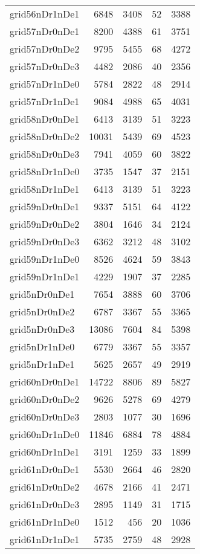 \begin{longtable}{lrrrr}
grid56nDr1nDe1 & 6848 & 3408 & 52 & 3388 \\
grid57nDr0nDe1 & 8200 & 4388 & 61 & 3751 \\
grid57nDr0nDe2 & 9795 & 5455 & 68 & 4272 \\
grid57nDr0nDe3 & 4482 & 2086 & 40 & 2356 \\
grid57nDr1nDe0 & 5784 & 2822 & 48 & 2914 \\
grid57nDr1nDe1 & 9084 & 4988 & 65 & 4031 \\
grid58nDr0nDe1 & 6413 & 3139 & 51 & 3223 \\
grid58nDr0nDe2 & 10031 & 5439 & 69 & 4523 \\
grid58nDr0nDe3 & 7941 & 4059 & 60 & 3822 \\
grid58nDr1nDe0 & 3735 & 1547 & 37 & 2151 \\
grid58nDr1nDe1 & 6413 & 3139 & 51 & 3223 \\
grid59nDr0nDe1 & 9337 & 5151 & 64 & 4122 \\
grid59nDr0nDe2 & 3804 & 1646 & 34 & 2124 \\
grid59nDr0nDe3 & 6362 & 3212 & 48 & 3102 \\
grid59nDr1nDe0 & 8526 & 4624 & 59 & 3843 \\
grid59nDr1nDe1 & 4229 & 1907 & 37 & 2285 \\
grid5nDr0nDe1 & 7654 & 3888 & 60 & 3706 \\
grid5nDr0nDe2 & 6787 & 3367 & 55 & 3365 \\
grid5nDr0nDe3 & 13086 & 7604 & 84 & 5398 \\
grid5nDr1nDe0 & 6779 & 3367 & 55 & 3357 \\
grid5nDr1nDe1 & 5625 & 2657 & 49 & 2919 \\
grid60nDr0nDe1 & 14722 & 8806 & 89 & 5827 \\
grid60nDr0nDe2 & 9626 & 5278 & 69 & 4279 \\
grid60nDr0nDe3 & 2803 & 1077 & 30 & 1696 \\
grid60nDr1nDe0 & 11846 & 6884 & 78 & 4884 \\
grid60nDr1nDe1 & 3191 & 1259 & 33 & 1899 \\
grid61nDr0nDe1 & 5530 & 2664 & 46 & 2820 \\
grid61nDr0nDe2 & 4678 & 2166 & 41 & 2471 \\
grid61nDr0nDe3 & 2895 & 1149 & 31 & 1715 \\
grid61nDr1nDe0 & 1512 & 456 & 20 & 1036 \\
grid61nDr1nDe1 & 5735 & 2759 & 48 & 2928 \\

\end{longtable}
